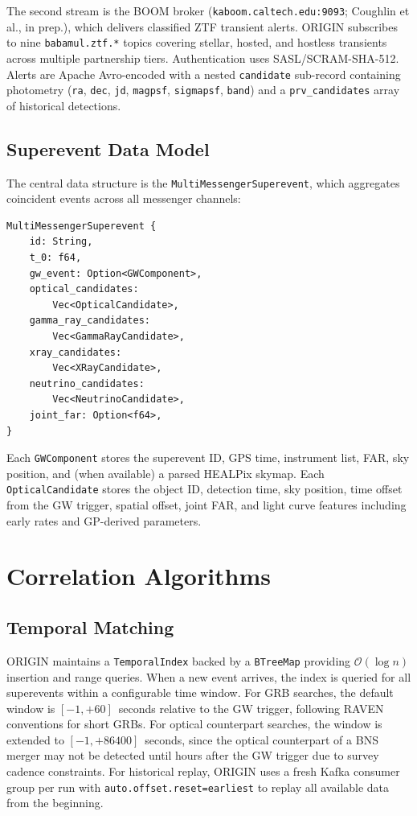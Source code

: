\documentclass[twocolumn]{article}
\begin{document}
The second stream is the BOOM broker (\texttt{kaboom.caltech.edu:9093}; Coughlin et al., in prep.), which delivers classified ZTF transient alerts. ORIGIN subscribes to nine \texttt{babamul.ztf.*} topics covering stellar, hosted, and hostless transients across multiple partnership tiers. Authentication uses SASL/SCRAM-SHA-512. Alerts are Apache Avro-encoded with a nested \texttt{candidate} sub-record containing photometry (\texttt{ra}, \texttt{dec}, \texttt{jd}, \texttt{magpsf}, \texttt{sigmapsf}, \texttt{band}) and a \texttt{prv\_candidates} array of historical detections.

\subsection{Superevent Data Model} \label{sec:datamodel}

The central data structure is the \texttt{MultiMessengerSuperevent}, which aggregates coincident events across all messenger channels:

\begin{lstlisting}
MultiMessengerSuperevent {
    id: String,
    t_0: f64,
    gw_event: Option<GWComponent>,
    optical_candidates:
        Vec<OpticalCandidate>,
    gamma_ray_candidates:
        Vec<GammaRayCandidate>,
    xray_candidates:
        Vec<XRayCandidate>,
    neutrino_candidates:
        Vec<NeutrinoCandidate>,
    joint_far: Option<f64>,
}
\end{lstlisting}

Each \texttt{GWComponent} stores the superevent ID, GPS time, instrument list, FAR, sky position, and (when available) a parsed HEALPix skymap. Each \texttt{OpticalCandidate} stores the object ID, detection time, sky position, time offset from the GW trigger, spatial offset, joint FAR, and light curve features including early rates and GP-derived parameters.

\section{Correlation Algorithms} \label{sec:correlation}

\subsection{Temporal Matching} \label{sec:temporal}

ORIGIN maintains a \texttt{TemporalIndex} backed by a \texttt{BTreeMap} providing $\mathcal{O}(\log n)$ insertion and range queries. When a new event arrives, the index is queried for all superevents within a configurable time window. For GRB searches, the default window is $[-1, +60]$~seconds relative to the GW trigger, following RAVEN conventions for short GRBs. For optical counterpart searches, the window is extended to $[-1, +86400]$~seconds, since the optical counterpart of a BNS merger may not be detected until hours after the GW trigger due to survey cadence constraints. For historical replay, ORIGIN uses a fresh Kafka consumer group per run with \texttt{auto.offset.reset=earliest} to replay all available data from the beginning.
\end{document}

